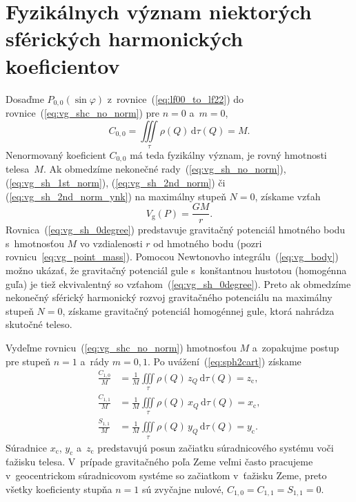 \documentclass[a4paper,12pt]{book}
\newcommand{\diff}{\mathrm d}
\newcommand{\gidx}{\mathrm g}
\begin{document}

\section{Fyzikálnych význam niektorých sférických harmonických koeficientov}
\label{sec:physical_meaning_of_spherical_harmonic_coefficients}

Dosaďme $P_{0,0}(\sin\varphi)$ z~rovnice~(\ref{eq:lf00_to_lf22})
do rovnice~(\ref{eq:vg_shc_no_norm}) pre $n = 0$ a~$m = 0$,
%
\begin{equation}
C_{0,0} = \iiint\limits_{\tau} \rho(Q) \, \diff \tau(Q) = M{.}
\end{equation}
%
Nenormovaný koeficient $C_{0,0}$ má teda fyzikálny význam, je rovný hmotnosti 
telesa~$M$.  Ak obmedzíme nekonečné rady~(\ref{eq:vg_sh_no_norm}), 
(\ref{eq:vg_sh_1st_norm}), (\ref{eq:vg_sh_2nd_norm}) či 
(\ref{eq:vg_sh_2nd_norm_ynk}) na maximálny stupeň $N = 0$, získame vzťah
%
\begin{equation}
\label{eq:vg_sh_0degree}
V_\gidx(P) = \frac{GM}{r}{.}
\end{equation}
%
Rovnica~(\ref{eq:vg_sh_0degree}) predstavuje gravitačný potenciál hmotného bodu
s~hmotnosťou $M$ vo vzdialenosti $r$ od hmotného bodu (pozri
rovnicu~\ref{eq:vg_point_mass}).  Pomocou Newtonovho
integrálu~(\ref{eq:vg_body}) možno ukázať, že gravitačný potenciál gule
s~konštantnou hustotou (homogénna guľa) je tiež ekvivalentný so
vzťahom~(\ref{eq:vg_sh_0degree}).  Preto ak obmedzíme nekonečný sférický
harmonický rozvoj gravitačného potenciálu na maximálny stupeň $N = 0$, získame
gravitačný potenciál homogénnej gule, ktorá nahrádza skutočné teleso.

Vydeľme rovnicu~(\ref{eq:vg_shc_no_norm}) hmotnosťou $M$ a~zopakujme postup pre
stupeň $n = 1$ a~rády $m = 0, 1$.  Po uvážení~(\ref{eq:sph2cart}) získame
%
\begin{equation}
\begin{split}
\frac{C_{1,0}}{M} &= \frac{1}{M} \iiint\limits_{\tau} \rho(Q) \, z_Q \, \diff 
\tau(Q) = z_\mathrm{c}{,}\\
\frac{C_{1,1}}{M} &= \frac{1}{M} \iiint\limits_{\tau} \rho(Q) \, x_Q \, \diff 
\tau(Q) = x_\mathrm{c}{,}\\
\frac{S_{1,1}}{M} &= \frac{1}{M} \iiint\limits_{\tau} \rho(Q) \, y_Q \, \diff 
\tau(Q) = y_\mathrm{c}{.}
\end{split}
\end{equation}
%
Súradnice $x_\mathrm{c}$, $y_\mathrm{c}$ a~$z_\mathrm{c}$ predstavujú posun
začiatku súradnicového systému voči ťažisku telesa.  V~prípade gravitačného
poľa Zeme veľmi často pracujeme v~geocentrickom súradnicovom systéme so
začiatkom v~ťažisku Zeme, preto všetky koeficienty stupňa $n = 1$ sú zvyčajne
nulové, $C_{1,0} = C_{1,1} = S_{1,1} = 0$.
\end{document}
